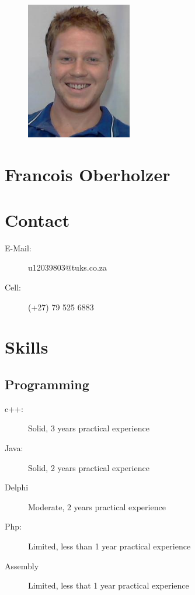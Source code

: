 

%

\begin{center}
	\begin{figure}[H]
		\centering
		\includegraphics[height=6cm]{francois}
	\end{figure}
\end{center}

\section*
{
	\Huge{Francois Oberholzer}
}
\vspace{0.5cm}

\section*{Contact}
	\begin{description}
		\item[E-Mail:] u12039803@tuks.co.za
		\item[Cell:] (+27) 79 525 6883
	\end{description}

\section*{Skills}

	\subsection*{Programming}
		\begin{description}
			\item[c++:]Solid, 3 years practical experience
			\item[Java:]Solid, 2 years practical experience
			\item[Delphi]Moderate, 2 years practical experience
            \item[Php:]Limited, less than 1 year practical experience
            \item[Assembly]Limited, less that 1 year practical experience
		\end{description}
